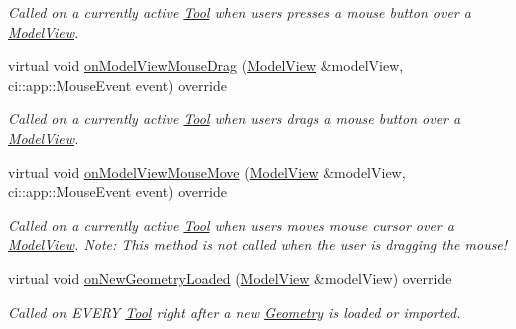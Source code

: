 \begin{DoxyCompactItemize}
\begin{DoxyCompactList}\small\item\em Called on a currently active \mbox{\hyperlink{classpepr3d_1_1_tool}{Tool}} when users presses a mouse button over a \mbox{\hyperlink{classpepr3d_1_1_model_view}{Model\+View}}. \end{DoxyCompactList}\item 
\mbox{\label{classpepr3d_1_1_semiautomatic_segmentation_a77e201830fcc97742fae904303cbcc01}} 
virtual void \mbox{\hyperlink{classpepr3d_1_1_semiautomatic_segmentation_a77e201830fcc97742fae904303cbcc01}{on\+Model\+View\+Mouse\+Drag}} (\mbox{\hyperlink{classpepr3d_1_1_model_view}{Model\+View}} \&model\+View, ci\+::app\+::\+Mouse\+Event event) override
\begin{DoxyCompactList}\small\item\em Called on a currently active \mbox{\hyperlink{classpepr3d_1_1_tool}{Tool}} when users drags a mouse button over a \mbox{\hyperlink{classpepr3d_1_1_model_view}{Model\+View}}. \end{DoxyCompactList}\item 
\mbox{\label{classpepr3d_1_1_semiautomatic_segmentation_afb75b5da63d4444c57f4f75ae1660935}} 
virtual void \mbox{\hyperlink{classpepr3d_1_1_semiautomatic_segmentation_afb75b5da63d4444c57f4f75ae1660935}{on\+Model\+View\+Mouse\+Move}} (\mbox{\hyperlink{classpepr3d_1_1_model_view}{Model\+View}} \&model\+View, ci\+::app\+::\+Mouse\+Event event) override
\begin{DoxyCompactList}\small\item\em Called on a currently active \mbox{\hyperlink{classpepr3d_1_1_tool}{Tool}} when users moves mouse cursor over a \mbox{\hyperlink{classpepr3d_1_1_model_view}{Model\+View}}. Note\+: This method is not called when the user is dragging the mouse! \end{DoxyCompactList}\item 
\mbox{\label{classpepr3d_1_1_semiautomatic_segmentation_aa682000b0095bf95a3d67d54977324bc}} 
virtual void \mbox{\hyperlink{classpepr3d_1_1_semiautomatic_segmentation_aa682000b0095bf95a3d67d54977324bc}{on\+New\+Geometry\+Loaded}} (\mbox{\hyperlink{classpepr3d_1_1_model_view}{Model\+View}} \&model\+View) override
\begin{DoxyCompactList}\small\item\em Called on E\+V\+E\+RY \mbox{\hyperlink{classpepr3d_1_1_tool}{Tool}} right after a new \mbox{\hyperlink{classpepr3d_1_1_geometry}{Geometry}} is loaded or imported. \end{DoxyCompactList}\item 

\end{DoxyCompactItemize}
